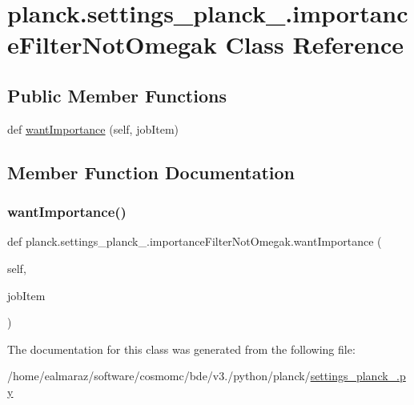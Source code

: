 \hypertarget{classplanck_1_1settings__planck__2015_1_1importanceFilterNotOmegak}{}\section{planck.\+settings\+\_\+planck\+\_.\+importance\+Filter\+Not\+Omegak Class Reference}
\label{classplanck_1_1settings__planck__2015_1_1importanceFilterNotOmegak}
\subsection*{Public Member Functions}
\begin{DoxyCompactItemize}
\item 
def \mbox{\hyperlink{classplanck_1_1settings__planck__2015_1_1importanceFilterNotOmegak_a9efc861160c59e6e06b08f3d7646fd9d}{want\+Importance}} (self, job\+Item)
\end{DoxyCompactItemize}


\subsection{Member Function Documentation}
\mbox{\label{classplanck_1_1settings__planck__2015_1_1importanceFilterNotOmegak_a9efc861160c59e6e06b08f3d7646fd9d}} 
\subsubsection{\texorpdfstring{want\+Importance()}{wantImportance()}}
{\footnotesize\ttfamily def planck.\+settings\+\_\+planck\+\_.\+importance\+Filter\+Not\+Omegak.\+want\+Importance (\begin{DoxyParamCaption}\item[{}]{self,  }\item[{}]{job\+Item }\end{DoxyParamCaption})}



The documentation for this class was generated from the following file\+:\begin{DoxyCompactItemize}
\item 
/home/ealmaraz/software/cosmomc/bde/v3./python/planck/\mbox{\hyperlink{settings__planck__2015_8py}{settings\+\_\+planck\+\_.\+py}}\end{DoxyCompactItemize}
